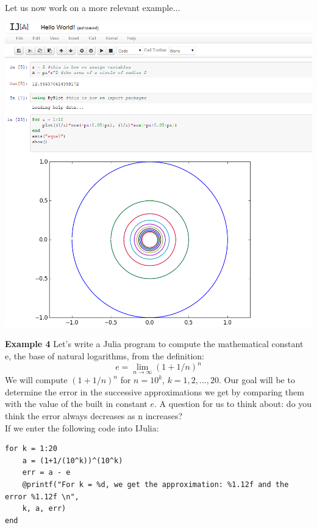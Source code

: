 \documentclass[11pt,a4paper,oneside]{report}
\begin{document}
Let us now work on a more relevant example...\\

\begin{center}
\includegraphics[width=7in]{IJuliaFirst.png}
\end{center}

\newpage
{\bf Example 4 } Let's write a Julia program to compute the mathematical constant e, the base of natural logarithms, from the definition:
\[ e = \lim\limits_{n \rightarrow \infty} (1+1/n)^n \]
We will compute $(1 + 1/n)^n$ for $n = 10^k$, $k = 1, 2, ..., 20$. Our goal will be to determine the error in the successive approximations we get by comparing them with the value of the built in constant $e$. A question for us to think about: do you think the error always decreases as n increases? \\

If we enter the following code into IJulia:\\
\begin{verbatim}
for k = 1:20
    a = (1+1/(10^k))^(10^k)
    err = a - e
    @printf("For k = %d, we get the approximation: %1.12f and the error %1.12f \n", 
    k, a, err)
end
\end{verbatim}
\end{document}
